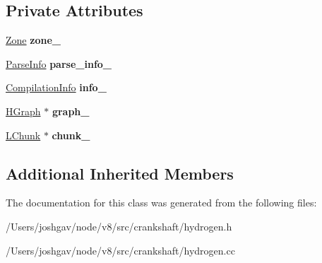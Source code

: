 \subsection*{Private Attributes}
\begin{DoxyCompactItemize}
\item 
\hyperlink{classv8_1_1internal_1_1_zone}{Zone} {\bfseries zone\+\_\+}\hypertarget{classv8_1_1internal_1_1_h_compilation_job_ae655db9209d242ac7dff0dae7d81d9e2}{}\label{classv8_1_1internal_1_1_h_compilation_job_ae655db9209d242ac7dff0dae7d81d9e2}

\item 
\hyperlink{classv8_1_1internal_1_1_parse_info}{Parse\+Info} {\bfseries parse\+\_\+info\+\_\+}\hypertarget{classv8_1_1internal_1_1_h_compilation_job_a12d471832f7a500e7d705471c8b97567}{}\label{classv8_1_1internal_1_1_h_compilation_job_a12d471832f7a500e7d705471c8b97567}

\item 
\hyperlink{classv8_1_1internal_1_1_compilation_info}{Compilation\+Info} {\bfseries info\+\_\+}\hypertarget{classv8_1_1internal_1_1_h_compilation_job_af87908981fd9966b13e96ea3a577d477}{}\label{classv8_1_1internal_1_1_h_compilation_job_af87908981fd9966b13e96ea3a577d477}

\item 
\hyperlink{classv8_1_1internal_1_1_h_graph}{H\+Graph} $\ast$ {\bfseries graph\+\_\+}\hypertarget{classv8_1_1internal_1_1_h_compilation_job_a64673fa0c408929bb197e211453d612c}{}\label{classv8_1_1internal_1_1_h_compilation_job_a64673fa0c408929bb197e211453d612c}

\item 
\hyperlink{classv8_1_1internal_1_1_l_chunk}{L\+Chunk} $\ast$ {\bfseries chunk\+\_\+}\hypertarget{classv8_1_1internal_1_1_h_compilation_job_a6c33cf167acc2628c8959a0b79a4cbab}{}\label{classv8_1_1internal_1_1_h_compilation_job_a6c33cf167acc2628c8959a0b79a4cbab}

\end{DoxyCompactItemize}
\subsection*{Additional Inherited Members}


The documentation for this class was generated from the following files\+:\begin{DoxyCompactItemize}
\item 
/\+Users/joshgav/node/v8/src/crankshaft/hydrogen.\+h\item 
/\+Users/joshgav/node/v8/src/crankshaft/hydrogen.\+cc\end{DoxyCompactItemize}
